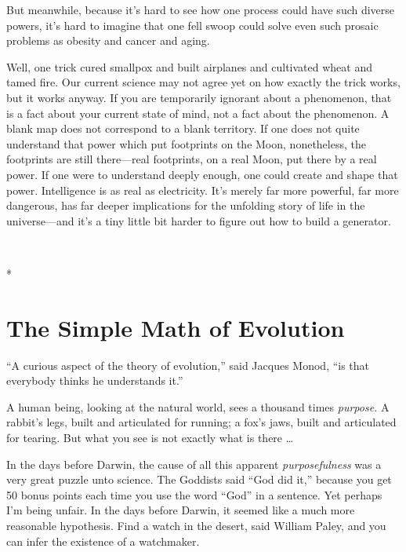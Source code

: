 {
 But meanwhile, because it's hard to see how one
process could have such diverse powers, it's hard to
imagine that one fell swoop could solve even such prosaic problems as
obesity and cancer and aging.}

{
 Well, one trick cured smallpox and built airplanes and cultivated
wheat and tamed fire. Our current science may not agree yet on how
exactly the trick works, but it works anyway. If you are temporarily
ignorant about a phenomenon, that is a fact about your current state of
mind, not a fact about the phenomenon. A blank map does not correspond
to a blank territory. If one does not quite understand that power which
put footprints on the Moon, nonetheless, the footprints are still
there---real footprints, on a real Moon, put there by a real power. If
one were to understand deeply enough, one could create and shape that
power. Intelligence is as real as electricity. It's
merely far more powerful, far more dangerous, has far deeper
implications for the unfolding story of life in the universe---and
it's a tiny little bit harder to figure out how to
build a generator.}

{\centering
 \ ~
\par}

{\centering
 *
\par}

\chapter{The Simple Math of Evolution}


{
 ``A curious aspect of the theory of
evolution,'' said Jacques Monod,
``is that everybody thinks he understands
it.'' }

{
 A human being, looking at the natural world, sees a thousand times
\textit{purpose.} A rabbit's legs, built and
articulated for running; a fox's jaws, built and
articulated for tearing. But what you see is not exactly what is there
\ldots}

{
 In the days before Darwin, the cause of all this apparent
\textit{purposefulness} was a very great puzzle unto science. The
Goddists said ``God did it,''
because you get 50 bonus points each time you use the word
``God'' in a sentence. Yet perhaps
I'm being unfair. In the days before Darwin, it seemed
like a much more reasonable hypothesis. Find a watch in the desert,
said William Paley, and you can infer the existence of a watchmaker.}

